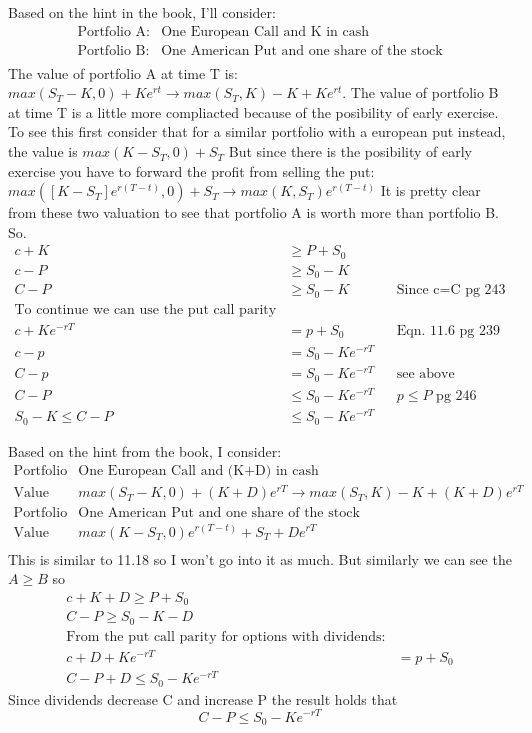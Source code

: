 \documentclass[12pt]{article}
\newenvironment{problem}[3][Problem]{\begin{trivlist}
\item[\hskip \labelsep {\bfseries #1}\hskip \labelsep {\bfseries #2.}]}{\end{trivlist}}
\begin{document}
\newpage
\begin{problem}{11.18}. Based on the hint in the book, I\rq{}ll consider:
\begin{align*}
\text{Portfolio A:} & \text{One European Call and K in cash} \\
\text{Portfolio B:} & \text{One American Put and one share of the stock} \\
\end{align*}
The value of portfolio A at time T is: $max(S_T - K,0) + Ke^{rt} \rightarrow max(S_T,K)-K+Ke^{rt}$. The value of portfolio B at time T is a little more compliacted because of the posibility of early exercise. To see this first consider that for a similar portfolio with a european put instead, the value is $max(K-S_T,0) + S_T$ But since there is the posibility of early exercise you have to forward the profit from selling the put: $max([K-S_T]e^{r(T-t)},0) + S_T \rightarrow max(K,S_T)e^{r(T-t)} $ It is pretty clear from these two valuation to see that portfolio A is worth more than portfolio B. So.
\begin{align*}
c + K & \geq P + S_0 \\
c - P & \geq S_0 - K \\
 C - P & \geq S_0 - K  && \text{Since c=C pg 243} \\
\text{To continue we can use the put call parity} \\
c+Ke^{-rT}&=p + S_0 &&\text{Eqn. 11.6 pg 239} \\
c-p &= S_0 - Ke^{-rT} \\
C-p &= S_0 - Ke^{-rT} && \text{see above} \\
C-P &\leq S_0 - Ke^{-rT} && p \leq P \text{  pg 246} \\
 S_0 - K \leq C-P &\leq S_0 - Ke^{-rT}
\end{align*}
\end{problem}

\newpage
\begin{problem}{11.19}. Based on the hint from the book, I consider:
\begin{align*}
\text{Portfolio A:} & \text{One European Call and (K+D) in cash} \\
\text{Value A: } & max(S_T-K,0) + (K+D)e^{rT}  \rightarrow max(S_T,K) - K + (K+D)e^{rT} \\
\text{Portfolio B:} & \text{One American Put and one share of the stock} \\
\text{Value B:} & max(K-S_T,0)e^{r(T-t)} + S_T + De^{rT} \\ 
\end{align*}
This is similar to 11.18 so I won\rq{}t go into it as much. But similarly we can see the $A\geq B$ so 
\begin{align*}
c+K+D \geq P + S_0 \\
C-P \geq S_0 - K - D \\
\text{From the put call parity for options with dividends:} \\
c+D+Ke^{-rT} &= p + S_0 \\ 
C-P + D \leq S_0 - Ke^{-rT}
\end{align*}
Since dividends decrease C and increase P the result holds that $$C-P\leq S_0 - Ke^{-rT}$$
\end{problem}
\newpage
\end{document}

